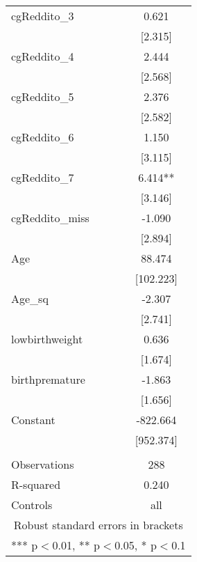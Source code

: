 \documentclass[]{article}
\begin{document}
\begin{tabular}{lc}
cgReddito\_3 & 0.621 \\
 & [2.315] \\
cgReddito\_4 & 2.444 \\
 & [2.568] \\
cgReddito\_5 & 2.376 \\
 & [2.582] \\
cgReddito\_6 & 1.150 \\
 & [3.115] \\
cgReddito\_7 & 6.414** \\
 & [3.146] \\
cgReddito\_miss & -1.090 \\
 & [2.894] \\
Age & 88.474 \\
 & [102.223] \\
Age\_sq & -2.307 \\
 & [2.741] \\
lowbirthweight & 0.636 \\
 & [1.674] \\
birthpremature & -1.863 \\
 & [1.656] \\
Constant & -822.664 \\
 & [952.374] \\
 &  \\
Observations & 288 \\
R-squared & 0.240 \\
 Controls & all \\ \hline
\multicolumn{2}{c}{ Robust standard errors in brackets} \\
\multicolumn{2}{c}{ *** p$<$0.01, ** p$<$0.05, * p$<$0.1} \\
\end{tabular}
\end{document}
